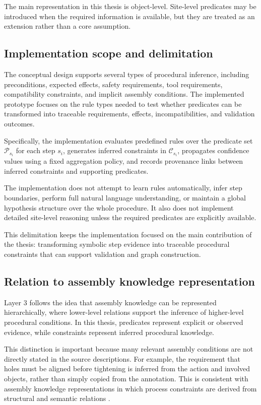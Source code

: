 The main representation in this thesis is object-level. Site-level predicates may be introduced when the required information is available, but they are treated as an extension rather than a core assumption.


\subsection{Implementation scope and delimitation}

The conceptual design supports several types of procedural inference, including preconditions, expected effects, safety requirements, tool requirements, compatibility constraints, and implicit assembly conditions. The implemented prototype focuses on the rule types needed to test whether predicates can be transformed into traceable requirements, effects, incompatibilities, and validation outcomes.

Specifically, the implementation evaluates predefined rules over the predicate set $\mathcal{P}_{s_i}$ for each step $s_i$, generates inferred constraints in $\mathcal{C}_{s_i}$, propagates confidence values using a fixed aggregation policy, and records provenance links between inferred constraints and supporting predicates.

The implementation does not attempt to learn rules automatically, infer step boundaries, perform full natural language understanding, or maintain a global hypothesis structure over the whole procedure. It also does not implement detailed site-level reasoning unless the required predicates are explicitly available.

This delimitation keeps the implementation focused on the main contribution of the thesis: transforming symbolic step evidence into traceable procedural constraints that can support validation and graph construction.

\subsection{Relation to assembly knowledge representation}

Layer 3 follows the idea that assembly knowledge can be represented hierarchically, where lower-level relations support the inference of higher-level procedural conditions. In this thesis, predicates represent explicit or observed evidence, while constraints represent inferred procedural knowledge.

This distinction is important because many relevant assembly conditions are not directly stated in the source descriptions. For example, the requirement that holes must be aligned before tightening is inferred from the action and involved objects, rather than simply copied from the annotation. This is consistent with assembly knowledge representations in which process constraints are derived from structural and semantic relations \citep{Zhu_2022}.


